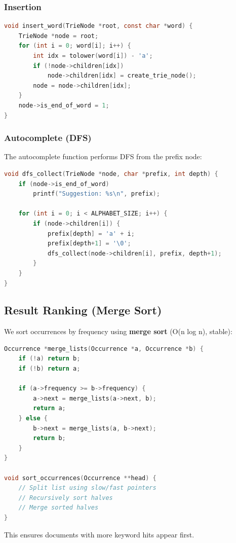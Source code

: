 \documentclass[12pt,a4paper]{article}
\begin{document}
\subsubsection{Insertion}
\begin{lstlisting}[language=C]
void insert_word(TrieNode *root, const char *word) {
    TrieNode *node = root;
    for (int i = 0; word[i]; i++) {
        int idx = tolower(word[i]) - 'a';
        if (!node->children[idx])
            node->children[idx] = create_trie_node();
        node = node->children[idx];
    }
    node->is_end_of_word = 1;
}
\end{lstlisting}

\subsubsection{Autocomplete (DFS)}
The autocomplete function performs DFS from the prefix node:
\begin{lstlisting}[language=C]
void dfs_collect(TrieNode *node, char *prefix, int depth) {
    if (node->is_end_of_word)
        printf("Suggestion: %s\n", prefix);
    
    for (int i = 0; i < ALPHABET_SIZE; i++) {
        if (node->children[i]) {
            prefix[depth] = 'a' + i;
            prefix[depth+1] = '\0';
            dfs_collect(node->children[i], prefix, depth+1);
        }
    }
}
\end{lstlisting}

\subsection{Result Ranking (Merge Sort)}

We sort occurrences by frequency using \textbf{merge sort} (O(n log n), stable):

\begin{lstlisting}[language=C]
Occurrence *merge_lists(Occurrence *a, Occurrence *b) {
    if (!a) return b;
    if (!b) return a;
    
    if (a->frequency >= b->frequency) {
        a->next = merge_lists(a->next, b);
        return a;
    } else {
        b->next = merge_lists(a, b->next);
        return b;
    }
}

void sort_occurrences(Occurrence **head) {
    // Split list using slow/fast pointers
    // Recursively sort halves
    // Merge sorted halves
}
\end{lstlisting}

This ensures documents with more keyword hits appear first.
\end{document}
